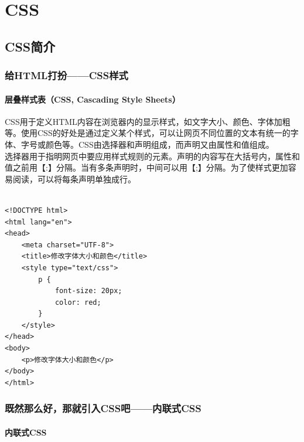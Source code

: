 \part{CSS}

\newpage

\chapter{CSS简介}

\section{给HTML打扮——CSS样式}

\subsection{层叠样式表（CSS, Cascading Style Sheets）}

CSS用于定义HTML内容在浏览器内的显示样式，如文字大小、颜色、字体加粗等。使用CSS的好处是通过定义某个样式，可以让网页不同位置的文本有统一的字体、字号或颜色等。CSS由选择器和声明组成，而声明又由属性和值组成。\\

选择器用于指明网页中要应用样式规则的元素。声明的内容写在大括号内，属性和值之前用【:】分隔。当有多条声明时，中间可以用【;】分隔。为了使样式更加容易阅读，可以将每条声明单独成行。\\

\\

\begin{lstlisting}[style=htmlcssjs]
<!DOCTYPE html>
<html lang="en">
<head>
    <meta charset="UTF-8">
    <title>修改字体大小和颜色</title>
    <style type="text/css">
        p {
            font-size: 20px;
            color: red;
        }
    </style>
</head>
<body>
    <p>修改字体大小和颜色</p>
</body>
</html>
\end{lstlisting}

\newpage

\section{既然那么好，那就引入CSS吧——内联式CSS}

\subsection{内联式CSS}

